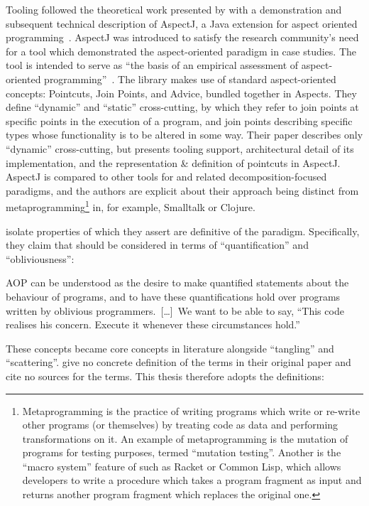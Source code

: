 Tooling followed the theoretical work presented by \citet{kiczales1997aspect}
with a demonstration and subsequent technical description of AspectJ, a Java
extension for aspect oriented
programming~\cite{AspectJLanguageAndTools,aspectj_intro}. AspectJ was introduced
to satisfy the research community's need for a tool which demonstrated the
aspect-oriented paradigm in case studies. The tool is intended to serve as ``the
basis of an empirical assessment of aspect-oriented
programming''~\cite{aspectj_intro}. The library makes use of standard
aspect-oriented concepts: Pointcuts, Join Points, and Advice, bundled together
in Aspects. They define ``dynamic'' and ``static'' cross-cutting, by which they
refer to join points at specific points in the execution of a program, and join
points describing specific types whose functionality is to be altered in some
way. Their paper describes only ``dynamic'' cross-cutting, but presents tooling
support, architectural detail of its implementation, and the representation \&
definition of pointcuts in AspectJ. AspectJ is compared to other tools for
\aspectorientation{} and related decomposition-focused paradigms, and the
authors are explicit about their approach being distinct from
metaprogramming\footnote{Metaprogramming is the practice of writing programs
which write or re-write other programs (or themselves) by treating code as data
and performing transformations on it. An example of metaprogramming is the
mutation of programs for testing purposes, termed ``mutation testing''. Another
is the ``macro system'' feature of such as Racket or Common Lisp, which allows
developers to write a procedure which takes a program fragment as input and
returns another program fragment which replaces the original one.} in, for
example, Smalltalk or Clojure.

\citet{filman2000aspect} isolate properties of \aspectorientation{} which they
assert are definitive of the paradigm. Specifically, they claim that \aop{}
should be considered in terms of ``quantification'' and ``obliviousness'':

\begin{displayquote}
AOP can be understood as the desire to make quantified statements about the
behaviour of programs, and to have these quantifications hold over programs
written by oblivious programmers.~[\ldots{}]~We want to be able to say, ``This
code realises his concern. Execute it whenever these circumstances hold.''
\end{displayquote}

These concepts became core concepts in \aspectorientation{} literature alongside
``tangling'' and ``scattering''. \citeauthor{filman2000aspect} give no concrete
definition of the terms in their original paper and cite no sources for the
terms. This thesis therefore adopts the definitions:

